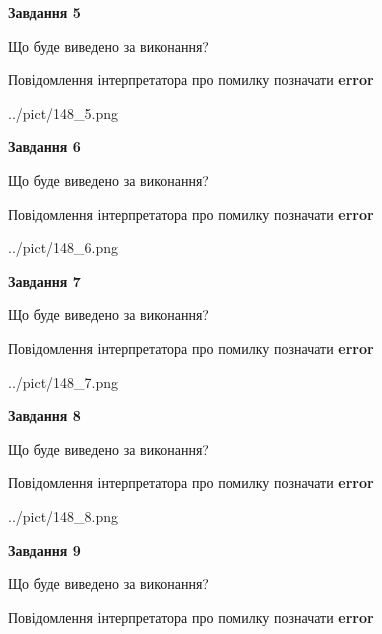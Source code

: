 \documentclass[11pt, ukrainian]{article}
\begin{document}
{\begin {large}
{\begin {center}\textbf{Завдання 5}\end {center}}\par
Що буде виведено за виконання? \par
Повідомлення інтерпретатора про помилку позначати \textbf{error}

\begin{center}
	{../pict/148_5.png}
\end{center}
\newpage

{\begin {center}\textbf{Завдання 6}\end {center}}\par
Що буде виведено за виконання? \par
Повідомлення інтерпретатора про помилку позначати \textbf{error}

\begin{center}
	{../pict/148_6.png}
\end{center}
\newpage

{\begin {center}\textbf{Завдання 7}\end {center}}\par
Що буде виведено за виконання? \par
Повідомлення інтерпретатора про помилку позначати \textbf{error}

\begin{center}
	{../pict/148_7.png}
\end{center}
\newpage

{\begin {center}\textbf{Завдання 8}\end {center}}\par
Що буде виведено за виконання? \par
Повідомлення інтерпретатора про помилку позначати \textbf{error}

\begin{center}
	{../pict/148_8.png}
\end{center}
\newpage

{\begin {center}\textbf{Завдання 9}\end {center}}\par
Що буде виведено за виконання? \par
Повідомлення інтерпретатора про помилку позначати \textbf{error}


\end{large}}
\end{document}
